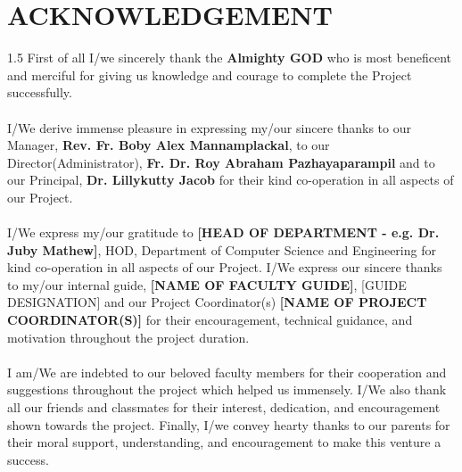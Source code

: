 \chapter*{ACKNOWLEDGEMENT}
\begin{spacing}{1.5}
First of all I/we sincerely thank the \textbf{Almighty GOD} who is most beneficent and merciful for giving us knowledge and courage to complete the Project successfully.\\\\
I/We derive immense pleasure in expressing my/our sincere thanks to our Manager, \textbf{Rev. Fr. Boby Alex Mannamplackal}, to our Director(Administrator), \textbf{Fr. Dr. Roy Abraham Pazhayaparampil} and to our Principal, \textbf{Dr. Lillykutty Jacob} for their kind co-operation in all aspects of our Project.\\\\
I/We express my/our gratitude to \textbf{[HEAD OF DEPARTMENT - e.g. Dr. Juby Mathew]}, HOD, Department of Computer Science and Engineering for kind co-operation in all aspects of our Project. I/We express our sincere thanks to my/our internal guide, \textbf{[NAME OF FACULTY GUIDE]}, [GUIDE DESIGNATION] and our Project Coordinator(s) \textbf{[NAME OF PROJECT COORDINATOR(S)]} for their encouragement, technical guidance, and motivation throughout the project duration.\\\\
I am/We are indebted to our beloved faculty members for their cooperation and suggestions throughout the project which helped us immensely. I/We also thank all our friends and classmates for their interest, dedication, and encouragement shown towards the project. Finally, I/we convey hearty thanks to our parents for their moral support, understanding, and encouragement to make this venture a success.

\end{spacing}
